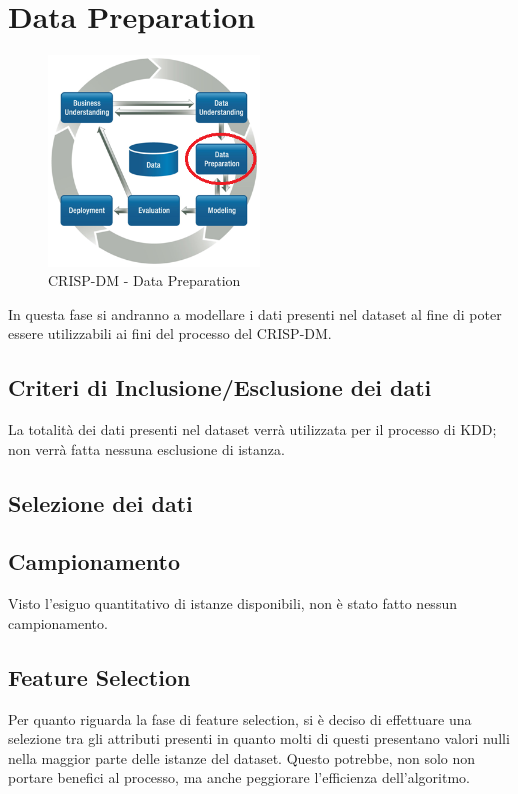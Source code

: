 \chapter{Data Preparation}

\begin{figure}[hbtp]
	\centering
	\includegraphics[width=0.5\textwidth]{./images/CRISPDM_3.png}
	\caption{CRISP-DM - Data Preparation}
	\label{CRISPDM_3}
\end{figure}

In questa fase si andranno a modellare i dati presenti nel dataset al fine di poter essere utilizzabili ai fini del processo del CRISP-DM.

\section{Criteri di Inclusione/Esclusione dei dati}

La totalità dei dati presenti nel dataset verrà utilizzata per il processo di KDD; non verrà fatta nessuna esclusione di istanza.

\section{Selezione dei dati}

\section{Campionamento}
Visto l'esiguo quantitativo di istanze disponibili, non è stato fatto nessun campionamento.

\section{Feature Selection}

Per quanto riguarda la fase di feature selection, si è deciso di effettuare una selezione tra gli attributi presenti in quanto molti di questi presentano valori nulli nella maggior parte delle istanze del dataset. Questo potrebbe, non solo non portare benefici al processo, ma anche peggiorare l'efficienza dell'algoritmo.

